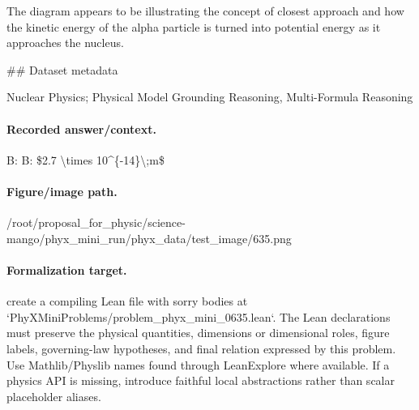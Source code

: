 The diagram appears to be illustrating the concept of closest approach and how the kinetic energy of the alpha particle is turned into potential energy as it approaches the nucleus.

\#\# Dataset metadata

Nuclear Physics; Physical Model Grounding Reasoning, Multi-Formula Reasoning

\paragraph{Recorded answer/context.}
B: B: \$2.7 \textbackslash{}times 10\textasciicircum{}\{-14\}\textbackslash{};m\$

\paragraph{Figure/image path.}
/root/proposal\_for\_physic/science-mango/phyx\_mini\_run/phyx\_data/test\_image/635.png

\paragraph{Formalization target.}
create a compiling Lean file with sorry bodies at `PhyXMiniProblems/problem\_phyx\_mini\_0635.lean`. The Lean declarations must preserve the physical quantities, dimensions or dimensional roles, figure labels, governing-law hypotheses, and final relation expressed by this problem.
Use Mathlib/Physlib names found through LeanExplore where available. If a physics API is missing, introduce faithful local abstractions rather than scalar placeholder aliases.

